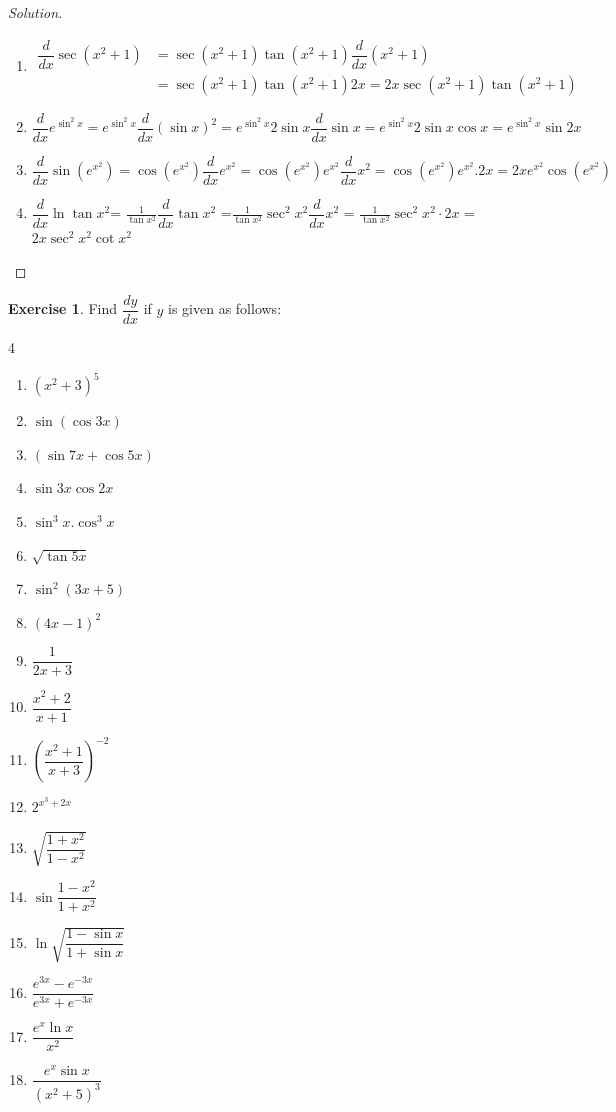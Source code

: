 \documentclass[../../main.tex]{subfiles}
\theoremstyle{definition}
\newtheorem{exercise}{Exercise}[section]
\newenvironment{solution}
    {\begin{proof}[Solution]}
    {\end{proof}}
\begin{document}
\begin{solution}
\begin{enumerate}[label=(\roman*)]
\item \begin{align*}
\dfrac{d}{dx} \sec (x^2+1) &= \sec (x^2+1)\tan(x^2+1)\dfrac{d}{dx}(x^2+1) \\
&= \sec (x^2+1)\tan(x^2+1)2x = 2x\sec (x^2+1)\tan(x^2+1)    
\end{align*}

\item $\dfrac{d}{dx} e^{\sin^2 x} = e^{\sin^2x}\dfrac{d}{dx} {(\sin x)^2} = e^{\sin^2x} 2\sin x \dfrac{d}{dx}\sin x = e^{\sin^2x} 2\sin x \cos x = e^{\sin^2 x}\sin 2x$

\item $\dfrac{d}{dx} \sin (e^{x^2}) = \cos (e^{x^2})\dfrac{d}{dx}e^{x^2} =
 \cos (e^{x^2})e^{x^2}\dfrac{d}{dx}x^2 = \cos (e^{x^2})e^{x^2}.2x = 2xe^{x^2}\cos (e^{x^2})$

\item $\dfrac{d}{dx} \ln \tan x^2$= $\frac{1}{\tan x^2} \dfrac{d}{dx}\tan x^2$ =$\frac{1}{\tan x^2} \sec^2 x^2\dfrac{d}{dx}x^2$ = $\frac{1}{\tan x^2} \sec^2 x^2\cdot2x$ =$2x\sec^2 x^2\cot x^2$
\end{enumerate}
\end{solution}


\begin{exercise}
Find $\dfrac{dy}{dx}$ if $y$ is given as follows:
\begin{multicols}{4}
\begin{enumerate}
    \item $(x^2+3)^5$
    \item $\sin (\cos 3x)$
    \item $(\sin 7x+\cos 5x)$   
    \item $\sin 3x\cos 2x$
    \item $\sin^3x.\cos^3x$
    \item $\sqrt{\tan 5x}$
    \item $\sin^2(3x+5)$
    \item $(4x-1)^2$
    \item $\dfrac{1}{2x+3}$
    \item $\dfrac{x^2+2}{x+1}$
    \item $(\dfrac{x^2+1}{x+3})^{-2}$
    \item $2^{x^3+2x}$
    \item$ \sqrt{\dfrac{1+x^2}{1-x^2}}$
    \item $\sin \dfrac{1-x^2}{1+x^2}$
    \item $\ln\sqrt{\dfrac{1-\sin x}{1+\sin x}}$
    \item $\dfrac{e^{3x}-e^{-3x}}{e^{3x}+e^{-3x}}$
    \item $\dfrac{e^x\ln x}{x^2}$
    \item $\dfrac{e^x \sin x}{(x^2+5)^3}$
\end{enumerate}
\end{multicols}
\end{exercise}
\end{document}
